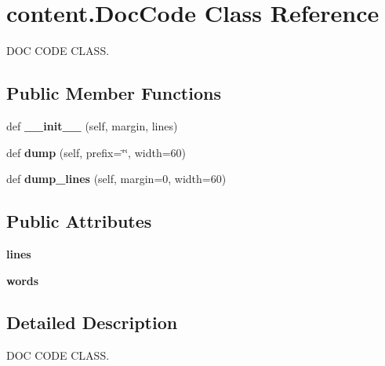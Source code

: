 \hypertarget{classcontent_1_1_doc_code}{}\section{content.\+Doc\+Code Class Reference}
\label{classcontent_1_1_doc_code}


D\+OC C\+O\+DE C\+L\+A\+SS.  


\subsection*{Public Member Functions}
\begin{DoxyCompactItemize}
\item 
\mbox{\label{classcontent_1_1_doc_code_a5f4187819fa137c62d33cb3006fc1cf7}} 
def {\bfseries \+\_\+\+\_\+init\+\_\+\+\_\+} (self, margin, lines)
\item 
\mbox{\label{classcontent_1_1_doc_code_a5a77b852a738b866cf8fd6ad27e653cf}} 
def {\bfseries dump} (self, prefix=\char`\"{}\char`\"{}, width=60)
\item 
\mbox{\label{classcontent_1_1_doc_code_ad7aa89f37768e49053f72b06ec454f8a}} 
def {\bfseries dump\+\_\+lines} (self, margin=0, width=60)
\end{DoxyCompactItemize}
\subsection*{Public Attributes}
\begin{DoxyCompactItemize}
\item 
\mbox{\label{classcontent_1_1_doc_code_acf0bd44d8350b84b7d71d2332968846e}} 
{\bfseries lines}
\item 
\mbox{\label{classcontent_1_1_doc_code_a9eb6bc9b9b3684e1722425e537288141}} 
{\bfseries words}
\end{DoxyCompactItemize}


\subsection{Detailed Description}
D\+OC C\+O\+DE C\+L\+A\+SS. 

